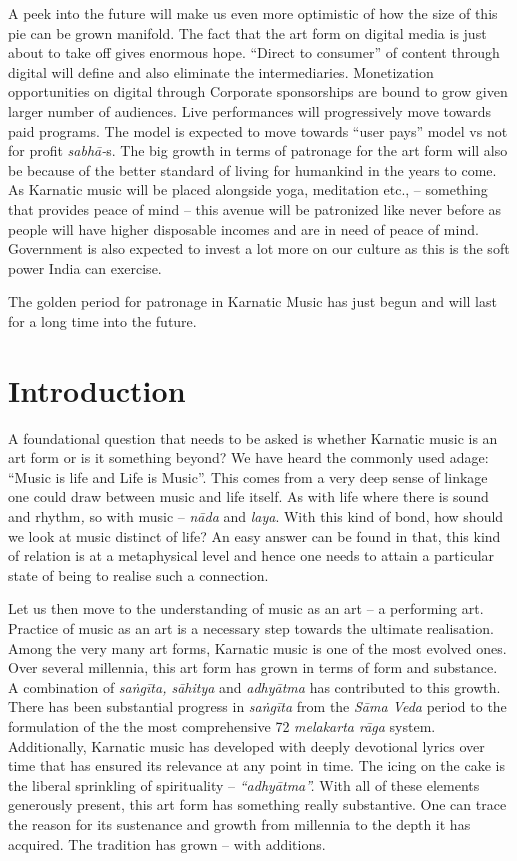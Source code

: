 A peek into the future will make us even more optimistic of how the size of this pie can be grown manifold. The fact that the art form on digital media is just about to take off gives enormous hope. “Direct to consumer” of content through digital will define and also eliminate the intermediaries. Monetization opportunities on digital through Corporate sponsorships are bound to grow given larger number of audiences. Live performances will progressively move towards paid programs. The model is expected to move towards “user pays” model vs not for profit \textit{sabhā-}s. The big growth in terms of patronage for the art form will also be because of the better standard of living for humankind in the years to come. As Karnatic music will be placed alongside yoga, meditation etc., – something that provides peace of mind – this avenue will be patronized like never before as people will have higher disposable incomes and are in need of peace of mind. Government is also expected to invest a lot more on our culture as this is the soft power India can exercise.

The golden period for patronage in Karnatic Music has just begun and will last for a long time into the future.


\section*{Introduction}

A foundational question that needs to be asked is whether Karnatic music is an art form or is it something beyond? We have heard the commonly used adage: “Music is life and Life is Music”. This comes from a very deep sense of linkage one could draw between music and life itself. As with life where there is sound and rhythm\textit{,} so with music – \textit{nāda} and \textit{laya}. With this kind of bond, how should we look at music distinct of life? An easy answer can be found in that, this kind of relation is at a metaphysical level and hence one needs to attain a particular state of being to realise such a connection.

Let us then move to the understanding of music as an art – a performing art. Practice of music as an art is a necessary step towards the ultimate realisation. Among the very many art forms, Karnatic music is one of the most evolved ones. Over several millennia, this art form has grown in terms of form and substance. A combination of \textit{saṅgīta, sāhitya} and \textit{adhyātma} has contributed to this growth. There has been substantial progress in \textit{saṅgīta} from the \textit{Sāma Veda} period to the formulation of the the most comprehensive 72 \textit{melakarta rāga} system. Additionally, Karnatic music has developed with deeply devotional lyrics over time that has ensured its relevance at any point in time. The icing on the cake is the liberal sprinkling of spirituality – \textit{“adhyātma”.} With all of these elements generously present, this art form has something really substantive. One can trace the reason for its sustenance and growth from millennia to the depth it has acquired. The tradition has grown – with additions.

